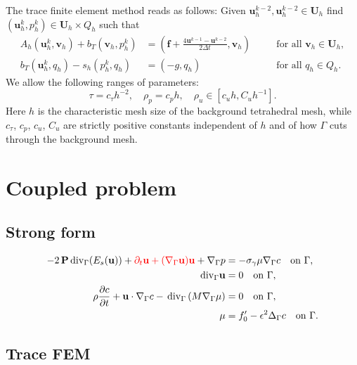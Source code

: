 \documentclass{article}
\newcommand{\bP}{\mathbf P}
\newcommand{\blf}{\mathbf f}
\newcommand{\bu}{\mathbf u}
\newcommand{\bU}{\mathbf U}
\newcommand{\bv}{\mathbf v}
\newcommand{\divG}{{\mathop{\,\rm div}}_{\Gamma}}
\newcommand{\gradG}{\nabla_{\Gamma}}
\newcommand{\nablaG}{\nabla_{\Gamma}}
\newcommand{\laplG}{\Delta_{\Gamma}}
\begin{document}
The trace finite element method reads as follows:
Given $ \bu_h^{k-2}, \bu_h^{k-2} \in \bU_h$ find $(\bu_h^k, p_h^k) \in \bU_h \times Q_h$ such that
\begin{equation} \label{discrete}
 \begin{aligned}
  A_h(\bu_h^k,\bv_h) + b_T(\bv_h,p_h^k) & =(\blf+\frac{4\bu^{k-1}-\bu^{k-2}}{2\Delta t},\bv_h) &\quad &\text{for all } \bv_h \in \bU_h, \\
  b_T(\bu_h^k,q_h)-s_h(p_h^k,q_h) & = (-g,q_h) &\quad &\text{for all }q_h \in Q_h.
 \end{aligned}
\end{equation}
We allow the following ranges of  parameters:
\begin{equation} \label{parameters}
\tau= c_\tau h^{-2},\quad \rho_p= c_p h, \quad \rho_u\in [c_u h,C_u h^{-1}].
\end{equation}
Here $h$ is the characteristic mesh size of the background tetrahedral mesh, while
$c_\tau$, $c_p$, $c_u$, $C_u$ are strictly positive constants  independent of $h$ and of how $\Gamma$ cuts through the background mesh. %


\newpage
\section{Coupled problem}
\subsection{Strong form}
\begin{align} %
- 2\,\bP \divG (E_s(\bu))+{\color{red}\partial_t\mathbf{u}+ (\nabla_\Gamma \mathbf{u})\mathbf{u}} +\nabla_\Gamma p &=   - \sigma_\gamma \mu \nablaG c \quad \text{on}~\Gamma,  \label{strongform-1} \\
\divG \bu & =0 \quad \text{on}~\Gamma, \label{strongform-2}\\
\rho \frac{\partial c}{\partial t} +\bu\cdot\nablaG c-  \divG \left(M \gradG \mu \right)  &= 0 \quad \text{on}~\Gamma \label{eq:sys_CH1}, \\
\mu &= f_0' - \epsilon^2 \laplG c \quad \text{on}~\Gamma. \label{eq:sys_CH2}
\end{align}


\subsection{Trace FEM}
\end{document}
